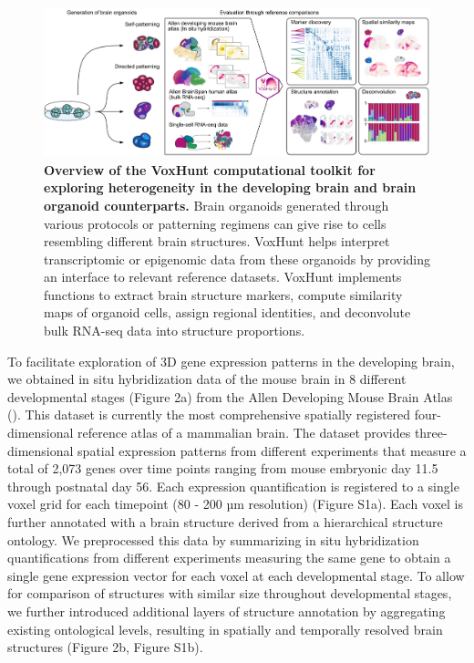 \begin{figure}[b!]
    \centering
	\includegraphics[width=\textwidth]{figures/voxhunt/Figure_1}
    \caption{\textbf{Overview of the VoxHunt computational toolkit for exploring heterogeneity in the developing brain and brain organoid counterparts.}
    Brain organoids generated through various protocols or patterning regimens can give rise to cells resembling different brain structures. VoxHunt helps interpret transcriptomic or epigenomic data from these organoids by providing an interface to relevant reference datasets. VoxHunt implements functions to extract brain structure markers, compute similarity maps of organoid cells, assign regional identities, and deconvolute bulk RNA-seq data into structure proportions.}
    \label{fig:vox1}
\end{figure}


To facilitate exploration of 3D gene expression patterns in the developing brain, we obtained in situ hybridization data of the mouse brain in 8 different developmental stages (Figure 2a) from the Allen Developing Mouse Brain Atlas (\cite{thompson_high-resolution_2014}). This dataset is currently the most comprehensive spatially registered four-dimensional reference atlas of a mammalian brain. The dataset provides three-dimensional spatial expression patterns from different experiments that measure a total of 2,073 genes over time points ranging from mouse embryonic day 11.5 through postnatal day 56. Each expression quantification is registered to a single voxel grid for each timepoint (80 - 200 µm resolution) (Figure S1a). Each voxel is further annotated with a brain structure derived from a hierarchical structure ontology. We preprocessed this data by summarizing in situ hybridization quantifications from different experiments measuring the same gene to obtain a single gene expression vector for each voxel at each developmental stage. To allow for comparison of structures with similar size throughout developmental stages, we further introduced additional layers of structure annotation by aggregating existing ontological levels, resulting in spatially and temporally resolved brain structures (Figure 2b, Figure S1b).


